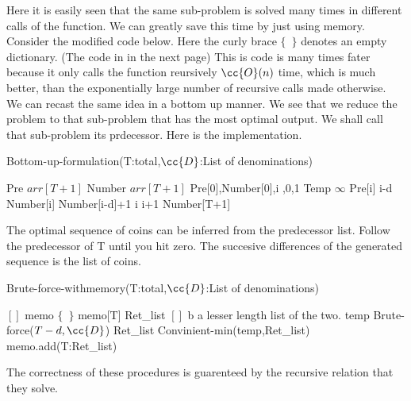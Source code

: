 \documentclass{myclass}
\begin{document}
Here it is easily seen that the same sub-problem is solved many times in different 
calls of the function. We can greatly save this time by just using memory. Consider the modified code below.
Here the curly brace $\{\,\,\,\}$ denotes an empty dictionary. (The code in in the next page)
This is code is many times fater because it only calls the function reursively $\cc{O}(n)$ time,
which is much better, than the exponentially large number of recursive calls made otherwise.
\\
We can recast the same idea in a bottom up manner. We see that we reduce the problem to that sub-problem that has the most optimal output.
We shall call that sub-problem its prdecessor. Here is the implementation.
\begin{algorithm}
    \caption*{Bottom-up-formulation(T:total,$\cc{D}$:List of denominations)}
    \begin{algorithmic}[1]
        \State Pre \ass $arr[T+1]$   
        \State Number \ass $arr[T+1]$   
        \State Pre[0],Number[0],i ,0,1
            \State Temp \ass $\infty$
                    \State Pre[i] \ass i-d 
                    \State Number[i] \ass Number[i-d]+1
                \EndIf
            \EndFor
        \State i \ass i+1
        \EndWhile
        \State {} Number[T+1]
    \end{algorithmic}
\end{algorithm}

The optimal sequence of coins can be inferred from the predecessor list. Follow the predecessor of T until you hit zero. The
succesive differences of the generated sequence is the list of coins.

\newpage
\begin{algorithm}
    \caption*{Brute-force-withmemory(T:total,$\cc{D}$:List of denominations)}
    \begin{algorithmic}[1]
            \State {} $[]$
        \EndIf
        \State memo \ass $\{\,\,\,\}$   
            \State {} memo[T]
        \EndIf
        \State Ret\_list \ass $[]$
                \State {} b
                \State {} a
            \Else 
                \State {} lesser length list of the two.
            \EndIf
        \EndProcedure
            \State temp \ass Brute-force($T-d,\cc{D}$)
            \State Ret\_list \ass Convinient-min(temp,Ret\_list)
        \EndFor
        \State memo.add(T:Ret\_list)
    \end{algorithmic}
\end{algorithm}

The correctness of these procedures is guarenteed by the recursive relation that they solve.
\end{document}
